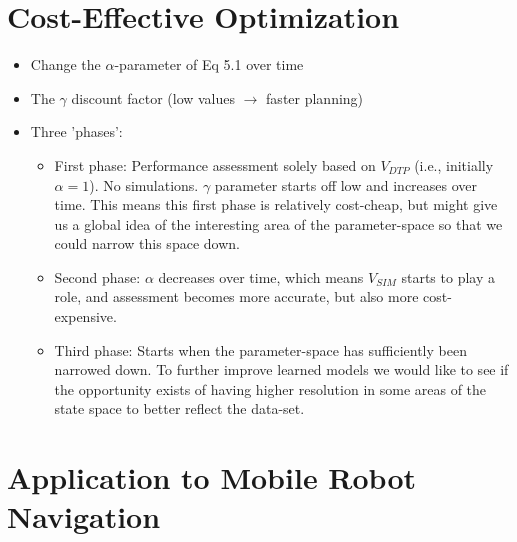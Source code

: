 

\section{Cost-Effective Optimization}
\label{sec:cost-effective-optimization}

\begin{itemize}
	\item Change the $\alpha$-parameter of Eq 5.1 over time
	\item The $\gamma$ discount factor (low values $\to$ faster planning)
	\item Three 'phases':
	\begin{itemize}
		\item First phase: Performance assessment solely based on $V_\mathit{DTP}$ (i.e., initially $\alpha = 1$). No simulations. $\gamma$ parameter starts off low and increases over time. This means this first phase is relatively cost-cheap, but might give us a global idea of the interesting area of the parameter-space so that we could narrow this space down.
		\item Second phase: $\alpha$ decreases over time, which means $V_\mathit{SIM}$ starts to play a role, and assessment becomes more accurate, but also more cost-expensive.
		\item Third phase: Starts when the parameter-space has sufficiently been narrowed down. To further improve learned models we would like to see if the opportunity exists of having higher resolution in some areas of the state space to better reflect the data-set.
	\end{itemize}
\end{itemize}

\section{Application to Mobile Robot Navigation}
\label{sec:application-mobile-robot}

